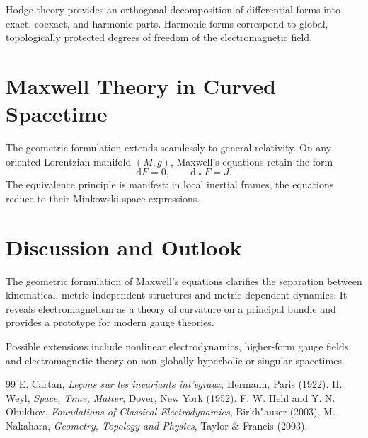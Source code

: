 \documentclass[11pt]{article}
\begin{document}
Hodge theory provides an orthogonal decomposition of differential forms into exact, coexact, and harmonic parts. Harmonic forms correspond to global, topologically protected degrees of freedom of the electromagnetic field.

\section{Maxwell Theory in Curved Spacetime}
The geometric formulation extends seamlessly to general relativity. On any oriented Lorentzian manifold $(M,g)$, Maxwell's equations retain the form
\begin{equation}
\mathrm{d}F = 0, \qquad \mathrm{d}\star F = J.
\end{equation}
The equivalence principle is manifest: in local inertial frames, the equations reduce to their Minkowski-space expressions.

\section{Discussion and Outlook}
The geometric formulation of Maxwell's equations clarifies the separation between kinematical, metric-independent structures and metric-dependent dynamics. It reveals electromagnetism as a theory of curvature on a principal bundle and provides a prototype for modern gauge theories.

Possible extensions include nonlinear electrodynamics, higher-form gauge fields, and electromagnetic theory on non-globally hyperbolic or singular spacetimes.

\begin{thebibliography}{99}
 E. Cartan, \emph{Le\c{c}ons sur les invariants int'egraux}, Hermann, Paris (1922).
 H. Weyl, \emph{Space, Time, Matter}, Dover, New York (1952).
 F. W. Hehl and Y. N. Obukhov, \emph{Foundations of Classical Electrodynamics}, Birkh"auser (2003).
 M. Nakahara, \emph{Geometry, Topology and Physics}, Taylor \& Francis (2003).
\end{thebibliography}
\end{document}
